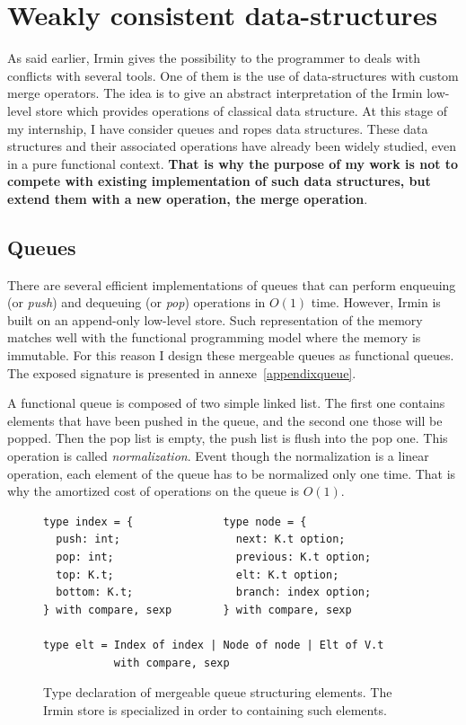 \documentclass{article}
\renewcommand{\-}{\hyp}
\newcommand{\irmin}{Irmin\xspace}
\begin{document}
\section{Weakly consistent data-structures}

As said earlier, \irmin gives the possibility to the programmer to deals with conflicts with several tools.
One of them is the use of data-structures with custom merge operators.
The idea is to give an abstract interpretation of the \irmin low-level store which provides operations of classical data structure.
At this stage of my internship, I have consider queues and ropes data structures.
These data structures and their associated operations have already been widely studied, even in a pure functional context\cite{PurelyFunctionalDataStructures1996}.
\textbf{That is why the purpose of my work is not to compete with existing implementation of such data structures, but extend them with a new operation, the merge operation}.


\subsection{Queues}

There are several efficient implementations of queues that can perform enqueuing (or \emph{push}) and dequeuing (or \emph{pop}) operations in $O(1)$ time.
However, \irmin is built on an append-only low-level store.
Such representation of the memory matches well with the functional programming model where the memory is immutable.
For this reason I design these mergeable queues as functional queues.
The exposed signature is presented in annexe~\ref{appendixqueue}.

A functional queue is composed of two simple linked list.
The first one contains elements that have been pushed in the queue, and the second one those will be popped.
Then the pop list is empty, the push list is flush into the pop one.
This operation is called \emph{normalization}.
Event though the normalization is a linear operation,  each element of the queue has to be normalized only one time.
That is why the amortized cost of operations on the queue is $O(1)$.

\begin{figure}[hbt]
\begin{lstlisting}
type index = {              type node = {
  push: int;                  next: K.t option;
  pop: int;                   previous: K.t option;
  top: K.t;                   elt: K.t option;
  bottom: K.t;                branch: index option;
} with compare, sexp        } with compare, sexp

type elt = Index of index | Node of node | Elt of V.t
           with compare, sexp
\end{lstlisting}
\caption{Type declaration of mergeable queue structuring elements. The \irmin store is specialized in order to containing such elements.}
\label{queuesig}
\end{figure}
\end{document}
